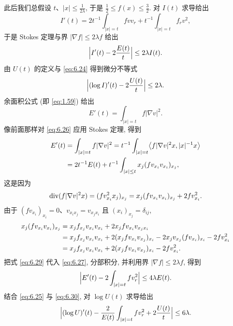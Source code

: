 此后我们总假设 $t$、$|x|\leq\frac{1}{2\lambda}$, 于是
$\frac12\leq f(x)\leq\frac32$. 对 $I(t)$ 求导给出
\begin{equation}
I'(t)=2t^{-1}\int_{|x|=t}fvv_r+t^{-1}\int_{|x|=t}f_rv^2,
\label{eq:6.23}
\end{equation}
于是 Stokes 定理与界 $|\nabla f|\leq2\lambda f$ 给出
\begin{equation}
\Bigl|I'(t)-2\frac{E(t)}{t}\Bigr|\leq2\lambda I(t).
\label{eq:6.24}
\end{equation}
由 $U(t)$ 的定义与 \eqref{eq:6.24} 得到微分不等式
\begin{equation}
\Bigl|(\log I)'(t)-2\frac{U(t)}{t}\Bigr|\leq2\lambda.
\label{eq:6.25}
\end{equation}
余面积公式 (即 \eqref{eq:1.59}) 给出
\begin{equation}
E'(t)=\int_{|x|=t}f|\nabla v|^2.
\label{eq:6.26}
\end{equation}
像前面那样对 \eqref{eq:6.26} 应用 Stokes 定理, 得到
\begin{align}
E'(t)&=\int_{|x|=t}f|\nabla v|^2
=t^{-1}\int_{|x|=t}\bigl\langle f|\nabla v|^2x,|x|^{-1}x\bigr\rangle
\notag\\
&=2t^{-1}E(t)+t^{-1}\int_{|x|\leq t}x_j(fv_{x_i}v_{x_i})_{x_j},
\label{eq:6.27}
\end{align}
这是因为
\begin{equation}
\operatorname{div}(f|\nabla v|^2x)=(fv_{x_i}^2x_j)_{x_j}
=x_j(fv_{x_i}v_{x_i})_{x_j}+2fv_{x_i}^2.
\label{eq:6.28}
\end{equation}
由于 $(fv_{x_i})_{x_i}=0$、$v_{x_ix_j}=v_{x_jx_i}$ 且
$(x_i)_{x_j}=\delta_{ij}$,
\begin{align}
x_j(fv_{x_i}v_{x_i})_{x_j}
&=x_jf_{x_j}v_{x_i}v_{x_i}+2x_jfv_{x_i}v_{x_jx_i}\notag\\
&=x_jf_{x_j}v_{x_i}v_{x_i}+2(x_jfv_{x_i}v_{x_j})_{x_i}
-2x_jv_{x_j}(fv_{x_i})_{x_i}-2fv_{x_i}^2\notag\\
&=x_jf_{x_j}v_{x_i}v_{x_i}+2(x_jfv_{x_i}v_{x_j})_{x_i}-2fv_{x_i}^2.
\label{eq:6.29}
\end{align}
把式 \eqref{eq:6.29} 代入 \eqref{eq:6.27}, 分部积分, 并利用界
$|\nabla f|\leq2\lambda f$, 得到
\begin{equation}
\Bigl|E'(t)-2\int_{|x|=t}fv_r^2\Bigr|\leq4\lambda E(t).
\label{eq:6.30}
\end{equation}
结合 \eqref{eq:6.25} 与 \eqref{eq:6.30}, 对 $\log U(t)$ 求导给出
\begin{equation}
\Bigl|(\log U)'(t)-\frac{2}{E(t)}\int_{|x|=t}fv_r^2
+2\frac{U(t)}{t}\Bigr|\leq6\lambda.
\label{eq:6.31}
\end{equation}
